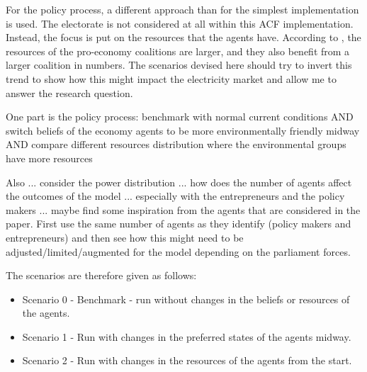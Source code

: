 \documentclass[12pt]{article}
\begin{document}
For the policy process, a different approach than for the simplest implementation is used. The electorate is not considered at all within this ACF implementation. Instead, the focus is put on the resources that the agents have. According to \cite{markard2016socio}, the resources of the pro-economy coalitions are larger, and they also benefit from a larger coalition in numbers. The scenarios devised here should try to invert this trend to show how this might impact the electricity market and allow me to answer the research question.

One part is the policy process: benchmark with normal current conditions AND switch beliefs of the economy agents to be more environmentally friendly midway AND compare different resources distribution where the environmental groups have more resources

Also ... consider the power distribution ... how does the number of agents affect the outcomes of the model ... especially with the entrepreneurs and the policy makers ... maybe find some inspiration from the agents that are considered in the \cite{markard2016socio} paper. First use the same number of agents as they identify (policy makers and entrepreneurs) and then see how this might need to be adjusted/limited/augmented for the model depending on the parliament forces.

The scenarios are therefore given as follows:

\begin{itemize}
\item Scenario 0 - Benchmark - run without changes in the beliefs or resources of the agents.
\item Scenario 1 - Run with changes in the preferred states of the agents midway.
\item Scenario 2 - Run with changes in the resources of the agents from the start.
\end{itemize}
\end{document}
